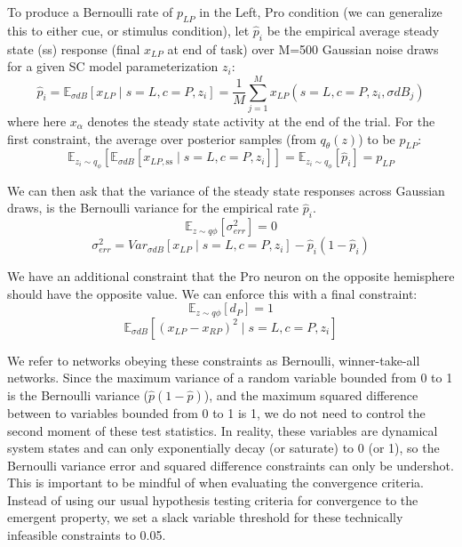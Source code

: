\documentclass[11pt]{article}
\begin{document}
To produce a Bernoulli rate of $p_{LP}$ in the Left, Pro condition (we can generalize this to either cue, or stimulus condition), let $\hat{p}_i$ be the empirical average steady state (ss) response (final $x_{LP}$ at end of task) over M=500 Gaussian noise draws for a given SC model parameterization $z_i$:
\begin{equation}
 \hat{p}_i = \mathbb{E}_{\sigma dB} \left[ x_{LP} \mid s=L, c=P, z_i \right] = \frac{1}{M}\sum_{j=1}^M x_{LP}(s=L, c=P, z_i, \sigma dB_j)
 \end{equation}
where here $x_\alpha$ denotes the steady state activity at the end of the trial.
For the first constraint, the average over posterior samples (from $q_\theta(z)$) to be $p_{LP}$:
\begin{equation}
\mathbb{E}_{z_i \sim q_\phi} \left[ \mathbb{E}_{\sigma dB} \left[ x_{LP,\text{ss}} \mid s=L, c=P, z_i \right] \right] = \mathbb{E}_{z_i \sim q_\phi} \left[ \hat{p}_i \right] = p_{LP}
\end{equation}

We can then ask that the variance of the steady state responses across Gaussian draws, is the Bernoulli variance for the empirical rate $\hat{p}_i$.
\begin{equation}
\mathbb{E}_{z \sim q\phi} \left[ \sigma^2_{err} \right] = 0
\end{equation}
\begin{equation}
\sigma^2_{err} = Var_{\sigma dB} \left[ x_{LP} \mid s=L, c=P, z_i \right] - \hat{p}_i(1 - \hat{p}_i)
\end{equation}

We have an additional constraint that the Pro neuron on the opposite hemisphere should have the opposite value.  We can enforce this with a final constraint:
\begin{equation}
\mathbb{E}_{z \sim q\phi} \left[ d_P \right] = 1
\end{equation}
\begin{equation}
\mathbb{E}_{\sigma dB} \left[ (x_{LP} - x_{RP})^2  \mid s=L, c=P, z_i \right]
\end{equation}

We refer to networks obeying these constraints as Bernoulli, winner-take-all networks.  Since the maximum variance of a random variable bounded from 0 to 1 is the Bernoulli variance ($\hat{p}(1-\hat{p})$), and the maximum squared difference between to variables bounded from 0 to 1 is 1, we do not need to control the second moment of these test statistics.  In reality, these variables are dynamical system states and can only exponentially decay (or saturate) to 0 (or 1), so the Bernoulli variance error and squared difference constraints can only be undershot.  This is important to be mindful of when evaluating the convergence criteria.  Instead of using our usual hypothesis testing criteria for convergence to the emergent property, we set a slack variable threshold for these technically infeasible constraints to 0.05.
\end{document}
